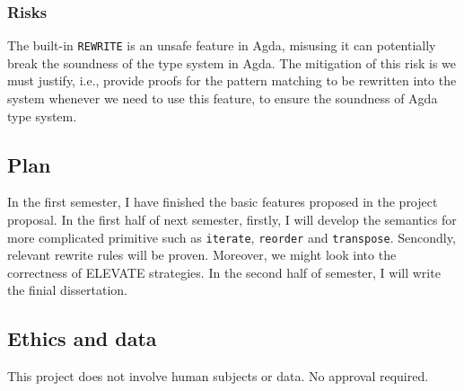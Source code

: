 \documentclass[11pt]{article}
\begin{document}
\subsubsection{Risks}\label{risks}
The built-in \texttt{REWRITE} is an unsafe feature in Agda, misusing it can potentially break the soundness of 
the type system in Agda. The mitigation of this risk is we must justify, i.e., provide proofs for the pattern 
matching to be rewritten into the system whenever we need to use this feature, to ensure the soundness of Agda type system.

\subsection{Plan}\label{plan}
In the first semester, I have finished the basic features proposed in the project proposal. In the first half of 
next semester, firstly, I will develop the semantics for more complicated primitive such as \texttt{iterate}, 
\texttt{reorder} and \texttt{transpose}. Sencondly, relevant rewrite rules will be proven. Moreover, we might 
look into the correctness of ELEVATE strategies. In the second half of semester, I will write the finial 
dissertation.

    
\subsection{Ethics and data}\label{ethics}
This project does not involve human subjects or data. No approval required.
\end{document}
